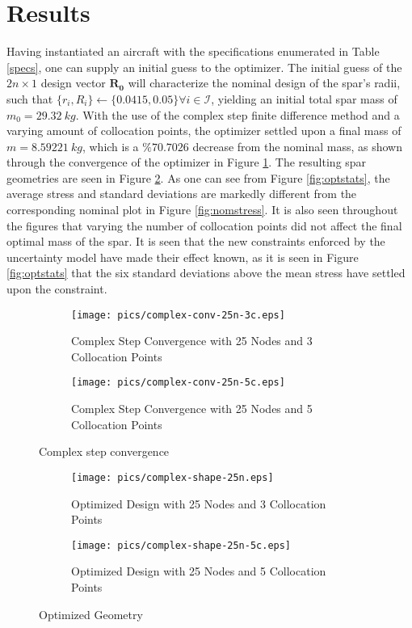 \documentclass{article}
\begin{document}
\section{Results}
Having instantiated an aircraft with the specifications enumerated in Table \ref{specs}, one can supply an initial guess to the optimizer. The initial guess of the $2n \times 1$ design vector $\mathbf{R_0}$ will characterize the nominal design of the spar's radii, such that $ \{r_i, R_i\} \leftarrow \{0.0415, 0.05 \} \forall i \in \mathcal{I}$, yielding an initial total spar mass of $m_0 = 29.32~kg$. With the use of the complex step finite difference method and a varying amount of collocation points, the optimizer settled upon a final mass of $m=8.59221~kg$, which is a $\%70.7026$ decrease from the nominal mass, as shown through the convergence of the optimizer in Figure \ref{fig:conv}. The resulting spar geometries are seen in Figure \ref{fig:geo}. As one can see from Figure \ref{fig:optstats}, the average stress and standard deviations are markedly different from the corresponding nominal plot in Figure \ref{fig:nomstress}. It is also seen throughout the figures that varying the number of collocation points did not affect the final optimal mass of the spar. It is seen that the new constraints enforced by the uncertainty model have made their effect known, as it is seen in Figure \ref{fig:optstats} that the six standard deviations above the mean stress have settled upon the constraint.


\begin{figure}

\begin{subfigure}{0.49\textwidth}
\texttt{[image: pics/complex-conv-25n-3c.eps]} 
\caption{Complex Step Convergence with 25 Nodes and 3 Collocation Points}
\end{subfigure}

\begin{subfigure}{0.49\textwidth}
\texttt{[image: pics/complex-conv-25n-5c.eps]}
\caption{Complex Step Convergence with 25 Nodes and 5 Collocation Points}
\end{subfigure}

\caption{Complex step convergence}
\label{fig:conv}
\end{figure}


\begin{figure}

\begin{subfigure}{0.49\textwidth}
\texttt{[image: pics/complex-shape-25n.eps]} 
\caption{Optimized Design with 25 Nodes and 3 Collocation Points}
\end{subfigure}

\begin{subfigure}{0.49\textwidth}
\texttt{[image: pics/complex-shape-25n-5c.eps]}
\caption{Optimized Design with 25 Nodes and 5 Collocation Points}
\end{subfigure}

\caption{Optimized Geometry}
\label{fig:geo}
\end{figure}
\end{document}
